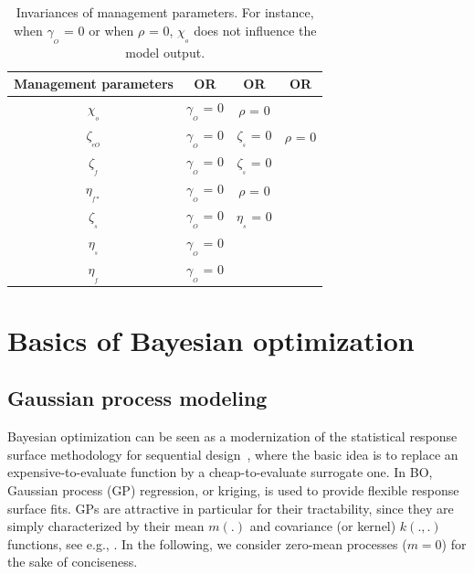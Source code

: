 	\begin{table}[htbp]
		\centering
		\caption{Invariances of management parameters. For instance, when  $\gamma_{_O}$ = 0 or when $\rho$ = 0, $\chi_{_o}$ does not influence the model output. }
		\begin{tabular}{|c|c|c|c|}
			\midrule
			\textbf{Management parameters} & \textbf{OR} & \textbf{OR} & \textbf{OR} \\
			\midrule
			$\chi_{_o}$ & $\gamma_{_O}$ = 0 & $\rho$ = 0 & \\
			\midrule
			$\zeta_{_{eO}}$ & $\gamma_{_O}$ = 0 & $\zeta_{_s}$ = 0 & $\rho$ = 0\\
			\midrule
			$\zeta_{_f}$ & $\gamma_{_O}$ = 0 & $\zeta_{_s}$ = 0 & \\
			\midrule
			$\eta_{_{f*}}$ & $\gamma_{_O}$ = 0 & $\rho$ = 0 & \\
			\midrule
			$\zeta_{_s}$ & $\gamma_{_O}$ = 0 & $\eta_{_s}$ = 0 & \\
			\midrule
			$\eta_{_s}$ & $\gamma_{_O}$ = 0 & & \\
			\midrule
			$\eta_{_f}$ & $\gamma_{_O}$ = 0 & & \\
			\midrule
			
		\end{tabular}%
		\label{tab:table_invariances_parameters}%
	\end{table}%


\section{Basics of Bayesian optimization}\label{sec:bo}

\subsection{Gaussian process modeling}
Bayesian optimization can be seen as a modernization of the statistical response surface
methodology for sequential design~\cite{box1987empirical}, where the basic idea is to replace an expensive-to-evaluate 
function by a cheap-to-evaluate surrogate one.
In BO, Gaussian process (GP) regression, or kriging, is used to provide flexible response surface fits.
GPs are attractive in particular for their tractability, 
since they are simply characterized by their mean $m(.)$ and covariance (or kernel) $k(.,.)$ functions, see e.g., \citet{Rasmussen2006}. 
In the following, we consider zero-mean processes ($m = 0$) for the sake of conciseness.


